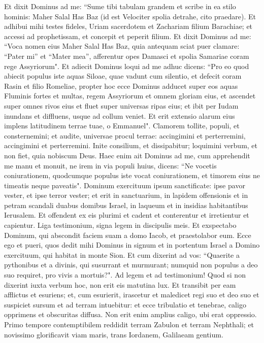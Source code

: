 \begin{biblechapter}  
\verse Et dixit Dominus ad me: “Sume tibi tabulam grandem et scribe in ea stilo hominis: Maher Salal Has Baz (id est Velociter spolia detrahe, cito praedare).  
\verse Et adhibui mihi testes fideles, Uriam sacerdotem et Zachariam filium Barachiae; 
\verse et accessi ad prophetissam, et concepit et peperit filium. Et dixit Dominus ad me: “Voca nomen eius Maher Salal Has Baz, 
\verse quia antequam sciat puer clamare: “Pater mi” et “Mater mea”, afferentur opes Damasci et spolia Samariae coram rege Assyriorum". 
\verse Et adiecit Dominus loqui ad me adhuc dicens: 
\verse “Pro eo quod abiecit populus iste aquas Siloae, quae vadunt cum silentio, et defecit coram Rasin et filio Romeliae, 
\verse propter hoc ecce Dominus adducet super eos aquas Fluminis fortes et multas, regem Assyriorum et omnem gloriam eius, et ascendet super omnes rivos eius et fluet super universas ripas eius; 
\verse et ibit per Iudam inundans et diffluens, usque ad collum veniet. Et erit extensio alarum eius implens latitudinem terrae tuae, o Emmanuel". 
\verse Clamorem tollite, populi, et consternemini; et audite, universae procul terrae: accingimini et perterremini, accingimini et perterremini. 
\verse Inite consilium, et dissipabitur; loquimini verbum, et non fiet, quia nobiscum Deus. 
\verse Haec enim ait Dominus ad me, cum apprehendit me manu et monuit, ne irem in via populi huius, dicens: 
\verse “Ne vocetis coniurationem, quodcumque populus iste vocat coniurationem, et timorem eius ne timeatis neque paveatis". 
\verse Dominum exercituum ipsum sanctificate: ipse pavor vester, et ipse terror vester; 
\verse et erit in sanctuarium, in lapidem offensionis et in petram scandali duabus domibus Israel, in laqueum et in insidias habitantibus Ierusalem. 
\verse Et offendent ex eis plurimi et cadent et conterentur et irretientur et capientur. 
\verse Liga testimonium, signa legem in discipulis meis. 
\verse Et exspectabo Dominum, qui abscondit faciem suam a domo Iacob, et praestolabor eum. 
\verse Ecce ego et pueri, quos dedit mihi Dominus in signum et in portentum Israel a Domino exercituum, qui habitat in monte Sion. 
\verse Et cum dixerint ad vos: “Quaerite a pythonibus et a divinis, qui susurrant et murmurant; numquid non populus a deo suo requiret, pro vivis a mortuis?". 
\verse Ad legem et ad testimonium! Quod si non dixerint iuxta verbum hoc, non erit eis matutina lux. 
\verse Et transibit per eam afflictus et esuriens; et, cum esurierit, irascetur et maledicet regi suo et deo suo et suspiciet sursum 
\verse et ad terram intuebitur: et ecce tribulatio et tenebrae, caligo opprimens et obscuritas diffusa. 
\verse Non erit enim amplius caligo, ubi erat oppressio. Primo tempore contemptibilem reddidit terram Zabulon et terram Nephthali; et novissimo glorificavit viam maris, trans Iordanem, Galilaeam gentium. 
\end{biblechapter}


